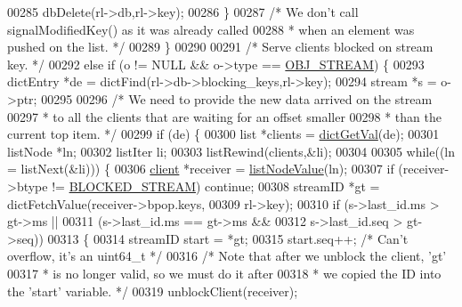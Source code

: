 \begin{DoxyCode}
00285                     dbDelete(rl->db,rl->key);
00286                 \}
00287                 \textcolor{comment}{/* We don't call signalModifiedKey() as it was already called}
00288 \textcolor{comment}{                 * when an element was pushed on the list. */}
00289             \}
00290 
00291             \textcolor{comment}{/* Serve clients blocked on stream key. */}
00292             \textcolor{keywordflow}{else} \textcolor{keywordflow}{if} (o != NULL && o->type == \hyperlink{server_8h_a2c2cc41300ca6b9daca7ea8a6d66edc6}{OBJ\_STREAM}) \{
00293                 dictEntry *de = dictFind(rl->db->blocking\_keys,rl->key);
00294                 stream *s = o->ptr;
00295 
00296                 \textcolor{comment}{/* We need to provide the new data arrived on the stream}
00297 \textcolor{comment}{                 * to all the clients that are waiting for an offset smaller}
00298 \textcolor{comment}{                 * than the current top item. */}
00299                 \textcolor{keywordflow}{if} (de) \{
00300                     list *clients = \hyperlink{dict_8h_ae8d2cc391873b2bea2b87c4f80f43120}{dictGetVal}(de);
00301                     listNode *ln;
00302                     listIter li;
00303                     listRewind(clients,&li);
00304 
00305                     \textcolor{keywordflow}{while}((ln = listNext(&li))) \{
00306                         \hyperlink{structclient}{client} *receiver = \hyperlink{adlist_8h_af84cae230e7180ebcda1e2736fce9f65}{listNodeValue}(ln);
00307                         \textcolor{keywordflow}{if} (receiver->btype != \hyperlink{server_8h_a1f48bb63f9d0c061421044b92b46f679}{BLOCKED\_STREAM}) \textcolor{keywordflow}{continue};
00308                         streamID *gt = dictFetchValue(receiver->bpop.keys,
00309                                                       rl->key);
00310                         \textcolor{keywordflow}{if} (s->last\_id.ms > gt->ms ||
00311                             (s->last\_id.ms == gt->ms &&
00312                              s->last\_id.seq > gt->seq))
00313                         \{
00314                             streamID start = *gt;
00315                             start.seq++; \textcolor{comment}{/* Can't overflow, it's an uint64\_t */}
00316                             \textcolor{comment}{/* Note that after we unblock the client, 'gt'}
00317 \textcolor{comment}{                             * is no longer valid, so we must do it after}
00318 \textcolor{comment}{                             * we copied the ID into the 'start' variable. */}
00319                             unblockClient(receiver);

\end{DoxyCode}
